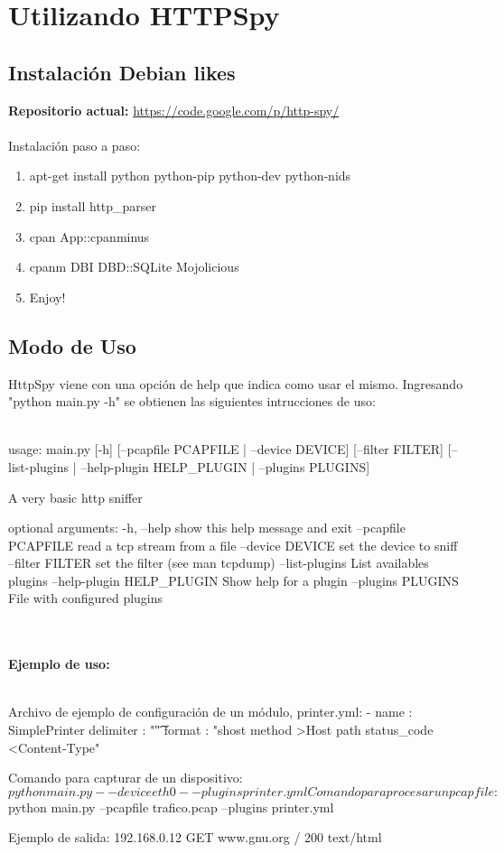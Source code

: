\section{Utilizando HTTPSpy}

\subsection{Instalación Debian likes}

\textbf{Repositorio actual:} \url{https://code.google.com/p/http-spy/}	
\\
\\\indent Instalación paso a paso:
\begin{enumerate}
	\item apt-get install python python-pip python-dev python-nids
	\item pip install http\_parser
	\item cpan App::cpanminus
	\item cpanm DBI DBD::SQLite Mojolicious
	\item Enjoy!
\end{enumerate}

\subsection{Modo de Uso}

HttpSpy viene con una opción de help que indica como usar el mismo. Ingresando "python main.py -h" se obtienen las siguientes intrucciones de uso:
\\\\
	{\small
	\begin{boxedverbatim}
	usage: main.py [-h] [--pcapfile PCAPFILE | --device DEVICE] 
	[--filter FILTER]
	[--list-plugins | --help-plugin HELP_PLUGIN | --plugins PLUGINS]

A very basic http sniffer

optional arguments:
  -h, --help            show this help message and exit
  --pcapfile PCAPFILE   read a tcp stream from a file
  --device DEVICE       set the device to sniff
  --filter FILTER       set the filter (see man tcpdump)
  --list-plugins        List availables plugins
  --help-plugin HELP_PLUGIN
                        Show help for a plugin
  --plugins PLUGINS     File with configured plugins
	\end{boxedverbatim}
	}
\\\\
\textbf{Ejemplo de uso:}
\\\\
{\small
\begin{boxedverbatim}
Archivo de ejemplo de configuración de un módulo, printer.yml:
	- name      : SimplePrinter
	  delimiter : "\t"
	  format    : "shost method >Host path status_code <Content-Type"

Comando para capturar de un dispositivo:
	$python main.py --device eth0 --plugins printer.yml

Comando para procesar un pcapfile:
	$python main.py --pcapfile trafico.pcap --plugins printer.yml

Ejemplo de salida:
	192.168.0.12	GET	www.gnu.org	/	200	text/html
\end{boxedverbatim}
}

